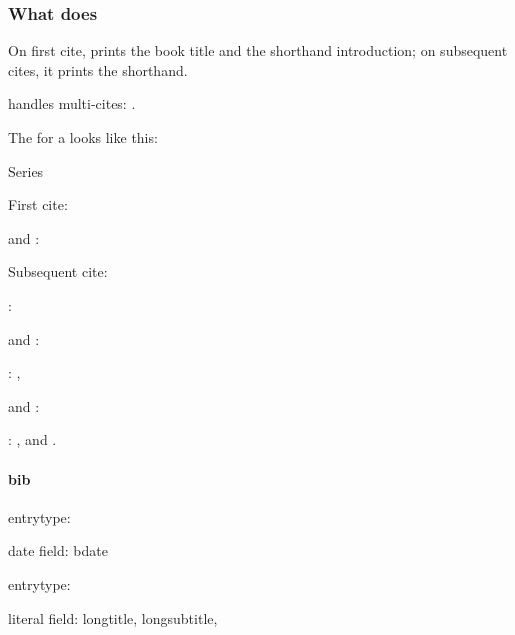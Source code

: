 
\subsubsection{What  does}
On first cite,  prints the book title and the shorthand introduction; on subsequent cites, it prints the shorthand.

 handles multi-cites: {\color{blue}}.

The  for a  looks like this:\\{\color{blue}}

Series


First cite:

 and : 


\nocite{bsm27,bsm28	,bsm31,bsm32,bsm22}

\medskip
Subsequent cite:

: \cite{lyonesse} 

and : 

: \cite{chroniclesofnarnia},

and : 


\medskip
{}: , and .


\paragraph{bib}

entrytype: 


date field: bdate

\medskip
entrytype: 

literal field:  longtitle,
  longsubtitle,


\ddivider







